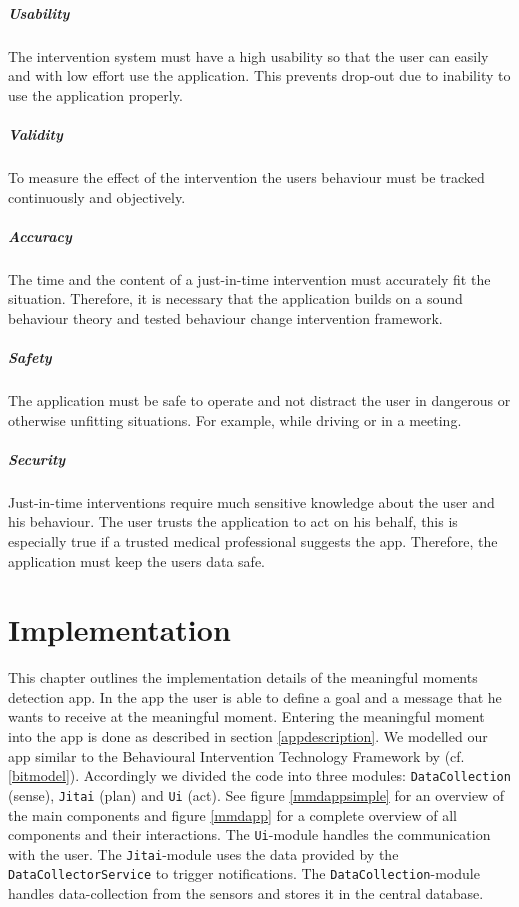 \documentclass[a4paper]{report}
\begin{document}
\paragraph{Usability} The intervention system must have a high usability so that the user can easily and with low effort use the application. This prevents drop-out due to inability to use the application properly.
\paragraph{Validity} To measure the effect of the intervention the users behaviour must be tracked continuously and objectively.
\paragraph{Accuracy} The time and the content of a just-in-time intervention must accurately fit the situation. Therefore, it is necessary that the application builds on a sound behaviour theory and tested behaviour change intervention framework.
\paragraph{Safety} The application must be safe to operate and not distract the user in dangerous or otherwise unfitting situations. For example, while driving or in a meeting.
\paragraph{Security} Just-in-time interventions require much sensitive knowledge about the user and his behaviour. The user trusts the application to act on his behalf, this is especially true if a trusted medical professional suggests the app. Therefore, the application must keep the users data safe.
\chapter{Implementation}\label{chap:implementation}
This chapter outlines the implementation details of the meaningful moments detection app. In the app the user is able to define a goal and a message that he wants to receive at the meaningful moment. Entering the meaningful moment into the app is done as described in section \ref{appdescription}. We modelled our app similar to the Behavioural Intervention Technology Framework by \cite{mohr2014behavioral} (cf. \autoref{bitmodel}). Accordingly we divided the code into three modules: \texttt{DataCollection} (sense), \texttt{Jitai} (plan) and \texttt{Ui} (act). See figure \ref{mmdappsimple} for an overview of the main components and figure \ref{mmdapp} for a complete overview of all components and their interactions. The \texttt{Ui}-module handles the communication with the user. The \texttt{Jitai}-module uses the data provided by the \texttt{DataCollectorService} to trigger notifications. The \texttt{DataCollection}-module handles data-collection from the sensors and stores it in the central database. 
\end{document}
